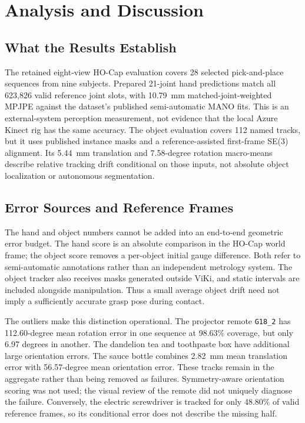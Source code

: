 \chapter{Analysis and Discussion}
\label{ch:disc}

\section{What the Results Establish}
\label{sec:interpretation}

The retained eight-view HO-Cap evaluation covers 28 selected
pick-and-place sequences from nine subjects. Prepared 21-joint hand
predictions match all 623,826 valid reference joint slots, with
10.79~mm matched-joint-weighted MPJPE against the dataset's published
semi-automatic MANO fits. This is an external-system perception
measurement, not evidence that the local Azure Kinect rig has the
same accuracy. The object evaluation covers 112 named tracks, but it
uses published instance masks and a reference-assisted first-frame
SE(3) alignment. Its 5.44~mm translation and 7.58-degree rotation
macro-means describe relative tracking drift conditional on those
inputs, not absolute object localization or autonomous segmentation.

\section{Error Sources and Reference Frames}
\label{sec:errbudget}

The hand and object numbers cannot be added into an end-to-end geometric
error budget. The hand score is an absolute comparison in the HO-Cap
world frame; the object score removes a per-object initial gauge
difference. Both refer to semi-automatic annotations rather than an
independent metrology system. The object tracker also receives masks
generated outside ViKi, and static intervals are included alongside
manipulation. Thus a small average object drift need not imply a
sufficiently accurate grasp pose during contact.

The outliers make this distinction operational. The projector remote
\texttt{G18\_2} has 112.60-degree mean rotation error in one sequence
at 98.63\% coverage, but only 6.97 degrees in another. The dandelion
tea and toothpaste box have additional large orientation errors.
The sauce bottle combines 2.82~mm mean translation error with
56.57-degree mean orientation error. These tracks remain in the
aggregate rather than being removed as failures. Symmetry-aware
orientation scoring was not used; the visual review of the remote
did not uniquely diagnose the failure. Conversely, the electric
screwdriver is tracked for only 48.80\% of valid reference frames,
so its conditional error does not describe the missing half.

